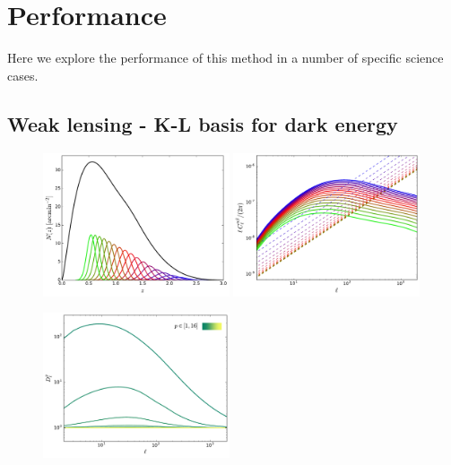 \documentclass[twocolumn,amsfont,amssymb,amsmath, showpacs,balancelastpage, nofootinbib]{revtex4-1}
\begin{document}
\section{Performance}\label{sec:results}
  Here we explore the performance of this method in a number of specific science cases.
  
  \subsection{Weak lensing - K-L basis for dark energy}\label{ssec:results.wl}
    \begin{figure}
      \centering
      \includegraphics[width=0.49\textwidth]{Figs/nz_lsst_wl}
      \includegraphics[width=0.49\textwidth]{Figs/c_ij_wl}
      \caption{}\label{fig:nz_wl}
    \end{figure}
    \begin{figure}
      \centering
      \includegraphics[width=0.49\textwidth]{Figs/d_p_wl}
      \caption{}\label{fig:dp_wl}
    \end{figure}
\end{document}
